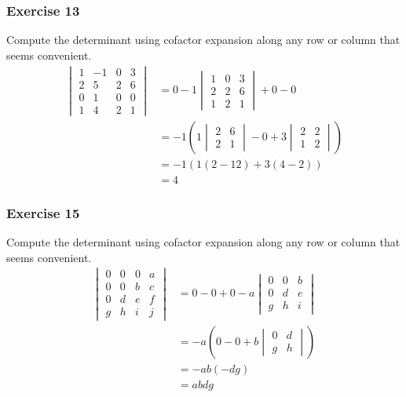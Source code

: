 \documentclass{math}
\begin{document}
\subsubsection*{Exercise 13}
Compute the determinant using cofactor expansion along any row or column that
seems convenient.
\begin{align*}
  \begin{vmatrix}
    1 & -1 & 0 & 3 \\
    2 & 5 & 2 & 6 \\
    0 & 1 & 0 & 0 \\
    1 & 4 & 2 & 1
  \end{vmatrix} &= 0-1\begin{vmatrix}
    1 & 0 & 3 \\
    2 & 2 & 6 \\
    1 & 2 & 1
  \end{vmatrix}+0-0 \\
  &= -1\left(1\begin{vmatrix}2 & 6 \\ 2 & 1\end{vmatrix}-0+
    3\begin{vmatrix}2 & 2 \\ 1 & 2\end{vmatrix}\right) \\
  &= -1(1(2-12)+3(4-2)) \\
  &= 4
\end{align*}

\subsubsection*{Exercise 15}
Compute the determinant using cofactor expansion along any row or column that
seems convenient.
\begin{align*}
  \begin{vmatrix}
    0 & 0 & 0 & a \\
    0 & 0 & b & c \\
    0 & d & e & f \\
    g & h & i & j
  \end{vmatrix} &= 0-0+0-a\begin{vmatrix}
    0 & 0 & b \\
    0 & d & e \\
    g & h & i
  \end{vmatrix} \\
  &= -a(0-0+b\begin{vmatrix}0 & d \\ g & h\end{vmatrix}) \\
  &= -ab(-dg) \\
  &= abdg
\end{align*}
\end{document}
